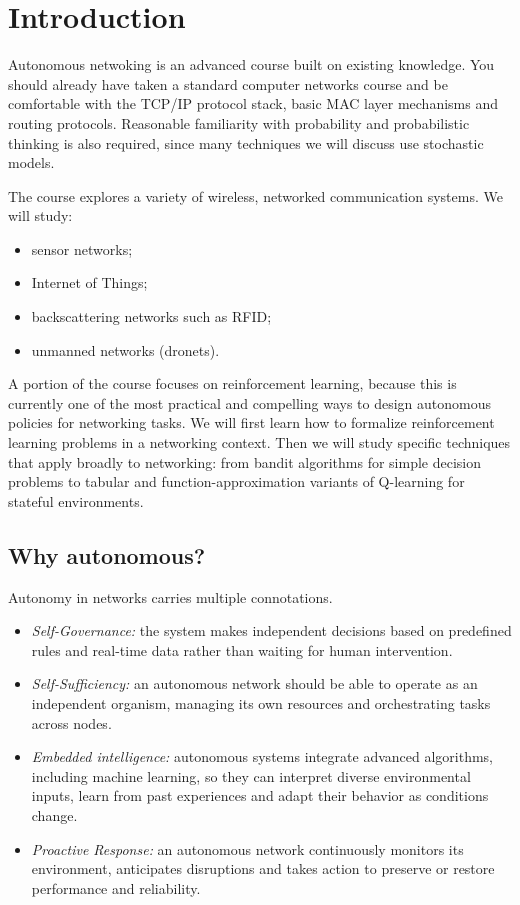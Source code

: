 \chapter{Introduction}
Autonomous netwoking is an advanced course built on existing knowledge. You should already have taken a standard computer networks course and be comfortable with the TCP/IP protocol stack, basic MAC layer mechanisms and routing protocols. Reasonable familiarity with probability and probabilistic thinking is also required, since many techniques we will discuss use stochastic models.

The course explores a variety of wireless, networked communication systems. We will study:
\begin{itemize}
    \item sensor networks;
    \item Internet of Things;
    \item backscattering networks such as RFID;
    \item unmanned networks (dronets).
\end{itemize}
A portion of the course focuses on reinforcement learning, because this is currently one of the most practical and compelling ways to design autonomous policies for networking tasks. We will first learn how to formalize reinforcement learning problems in a networking context. Then we will study specific techniques that apply broadly to networking: from bandit algorithms for simple decision problems to tabular and function-approximation variants of Q-learning for stateful environments.

\section{Why autonomous?}
Autonomy in networks carries multiple connotations. 
\begin{itemize}
    \item \textit{Self-Governance:} the system makes independent decisions based on predefined rules and real-time data rather than waiting for human intervention.
    \item \textit{Self-Sufficiency:} an autonomous network should be able to operate as an independent organism, managing its own resources and orchestrating tasks across nodes.
    \item \textit{Embedded intelligence:} autonomous systems integrate advanced algorithms, including machine learning, so they can interpret diverse environmental inputs, learn from past experiences and adapt their behavior as conditions change.
    \item \textit{Proactive Response:} an autonomous network continuously monitors its environment, anticipates disruptions and takes action to preserve or restore performance and reliability.
\end{itemize}

